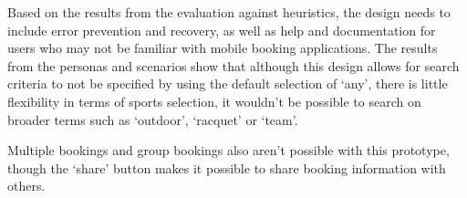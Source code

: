 Based on the results from the evaluation against heuristics, the design needs
to include error prevention and recovery, as well as help and documentation for
users who may not be familiar with mobile booking applications. The results
from the personas and scenarios show that although this design allows for
search criteria to not be specified by using the default selection of `any',
there is little flexibility in terms of sports selection, it wouldn’t be
possible to search on broader terms such as `outdoor', `racquet' or `team'.

Multiple bookings and group bookings also aren’t possible with this prototype,
though the `share' button makes it possible to share booking information with
others.

\restoregeometry%
